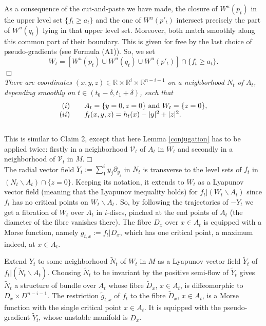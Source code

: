 \documentclass[12pt]{amsart}
\def\R{\mathbb{R}}
\def\de{\delta}
\def\nd{\noindent}
\def\bull{\hfill$\Box$\\}
\begin{document}
  \nd{\sc Proof.} As a consequence of the cut-and-paste we have made, 
  the closure of $W^u(p_t)$ in the upper 
  level set $\{f_t\geq a_t\}$ and the one of $W^u(p'_t)$ 
  intersect precisely  %
  the part of $W^u(q_t)$ lying in that upper level set. Moreover, both match smoothly along
  this common part of  their %
  boundary. This is given for free by the last choice of  pseudo-gradients (see Formula (A1)). 
  So, we set  
  $$W_t= \left[W^u(p_t)\cup W^u(q_t)\cup W^u(p'_t)\right]\cap \{f_t\geq a_t\}.
  $$ 
\bull
   
   \nd{\sc Claim 4.} {\it There are coordinates 
$(x, y,z)\in \R\times\R^i\times \R^{n-i-1}$ on a  neighborhood $N_t$ of $A_t$, depending smoothly on 
$t\in (t_0-\de,t_1+\de)$,  
such that  $$\begin{array}{rl}
{(i)}&\quad A_t= \{y=0,z=0\} \ {\rm and}\  W_t= \{z=0\},\\
{(ii)} &\quad f_t(x,y,z)=h_t(x)-\vert y\vert^2+\vert z\vert^2.
\end{array}
$$
}\\

\nd{\sc Proof.} This is similar to  Claim 2, except that here Lemma \ref{conjugation} has to be applied twice:
firstly in a neighborhood $\mathcal V_t$ of $A_t$ in $W_t$ and secondly in a neighborhood of  
$\mathcal V_t$ in $M$.\bull


  
 
    The radial  vector field $Y_t:= \sum_1^i y_j\partial_{y_j}$ in $N_t$ is transverse to the level sets of $f_t$
  in $(N_t\smallsetminus  A_t) \cap\{z=0\}$. 
 Keeping its notation, it extends to  $W_t$ as a Lyapunov vector field (meaning that 
 the Lyapunov inequality holds)
 for $f_t\vert (W_t\smallsetminus A_t)$ since $f_t$ has no critical points on 
 $W_t\smallsetminus  A_t$\,. So, by following the trajectories of $-Y_t$ we get a fibration 
 of $W_t$ over $ A_t$ in $i$-discs, pinched at the end points of $ A_t$ (the diameter of the fibre vanishes there). The fibre
 $D_x$ over $x\in  A_t$ is equipped with a Morse function, namely 
 $g_{t,x}:= f_t\vert D_x$, which has one critical point, a maximum
 indeed, at  $x\in  A_t$. 
 
 
 Extend $Y_t$  to some neighborhood 
 $\widetilde N_t$ of $W_t$ in $M$ 
 as a Lyapunov vector field $\widetilde Y_t$ of $f_t\vert (\widetilde N_t \smallsetminus A_t)$. 
 Choosing $\widetilde N_t$ to be invariant by the positive semi-flow of $\widetilde Y_t$ gives 
 $\widetilde N_t$ a structure
 of bundle over $A_t$ whose fibre $\widetilde D_x $, $x\in  A_t$,
 is diffeomorphic to $D_x\times D^{n-i-1}$.
 The restriction $\tilde g_{t,x}$ of $f_t$ to the
 fibre $\widetilde D_x$, $x\in  A_t$,
  is a Morse function with the single critical point $x\in A_t$.
  It is  equipped with the pseudo-gradient $\widetilde Y_t$,
 whose  unstable manifold is $D_x$. %
 
\end{document}
